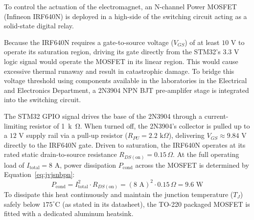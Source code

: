 To control the actuation of the electromagnet, an N-channel Power MOSFET (Infineon IRF640N) is deployed in a high-side of the switching circuit acting as a solid-state digital relay.

Because the IRF640N requires a gate-to-source voltage ($V_{GS}$) of at least $10\text{ V}$ to operate its saturation region, driving its gate directly from the STM32's $3.3\text{ V}$ logic signal would operate the MOSFET in its linear region. This would cause excessive thermal runaway and result in catastrophic damage. To bridge this voltage threshold using components available in the laboratories in the Electrical and Electronics Department, a 2N3904 NPN BJT pre-amplifer stage is integrated into the switching circuit.

The STM32 GPIO signal drives the base of the 2N3904 through a current-limiting resistor of \SI{1}{k\ohm}. When turned off, the 2N3904's collector is pulled up to a $12\text{ V}$ supply rail via a pull-up resistor ($R_{PU} = 2.2\text{ k}\Omega$), delivering $V_{GS} \approx 9.84\text{ V}$ directly to the IRF640N gate. Driven to saturation, the IRF640N operates at its rated static drain-to-source resistance $R_{DS(\text{on})} = 0.15\,\Omega$. At the full operating load of $I_{\text{total}} = 8\text{ A}$, power dissipation $P_{\text{cond}}$ across the MOSFET is determined by Equation~\ref{eq:jvjsnbpn}:
\begin{equation}
	\label{eq:jvjsnbpn}
	P_{\text{cond}} = I_{\text{total}}^2 \cdot R_{DS(\text{on})} = (8\text{ A})^2 \cdot 0.15\,\Omega = 9.6\text{ W}
\end{equation}
To dissipate this heat continuously and maintain the junction temperature ($T_J$) safely below $175^\circ\text{C}$ (as stated in its datasheet), the TO-220 packaged MOSFET is fitted with a dedicated aluminum heatsink.

